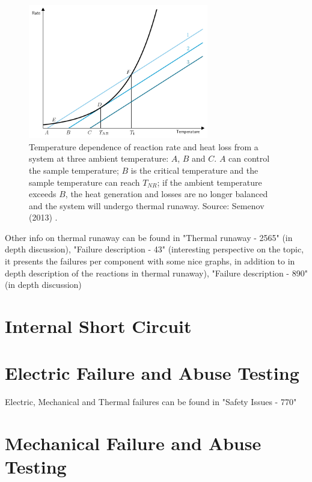 \begin{figure}[ht]
    \centering
    \includegraphics[width=0.7\textwidth]{Images/Chapter1/semenov-plot.png}
    \caption[Temperature dependence of reaction rate and heat loss]{Temperature dependence of reaction rate and heat loss from a system at three ambient temperature: $A$, $B$ and $C$. $A$ can control the sample temperature; $B$ is the critical temperature and the sample temperature can reach $T_{NR}$; if the ambient temperature exceeds $B$, the heat generation and losses are no longer balanced and the system will undergo thermal runaway. Source: Semenov (2013) \cite{semenov2013some}.}
    \label{fig:semenov-plot}
\end{figure}

Other info on thermal runaway can be found in "Thermal runaway - 2565" (in depth discussion), "Failure description - 43" (interesting perspective on the topic, it presents the failures per component with some nice graphs, in addition to in depth description of the reactions in thermal runaway), "Failure description - 890" (in depth discussion)

\section{Internal Short Circuit}
\label{sec:internal-short-circuit}

\section{Electric Failure and Abuse Testing}
\label{sec:electric-failure-abuse-testing}
Electric, Mechanical and Thermal failures can be found in "Safety Issues - 770"

\section{Mechanical Failure and Abuse Testing}
\label{sec:mechanical-failure-abuse-testing}

